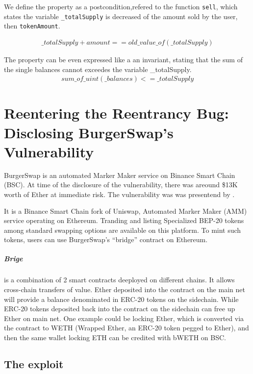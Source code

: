 We define the property as a postcondition,refered to the function \texttt{sell}, which states the variable \texttt{\_totalSupply} is decreased of the amount sold by the user, then \texttt{tokenAmount}.

\begin{equation}
    \begin{split}
        \_totalSupply + amount ==old\_value\_of(\_totalSupply) 
    \end{split}
\end{equation}

The property can be even expressed like a an invariant, stating that the sum of the single balances cannot exceedes the variable \_totalSupply.
\begin{equation}
    \begin{split}
        sum\_of\_uint(\_balances) <= \_totalSupply
    \end{split}
\end{equation}

\section{Reentering the Reentrancy Bug: Disclosing BurgerSwap's Vulnerability}   
\label{sec:Exploits:BurgerSwap}
BurgerSwap is an automated Marker Maker service on Binance Smart Chain (BSC). 
At time of the disclosure of the vulnerability, there was areound \$13K worth of Ether at immediate risk.
The vulnerability was was presentend by \citet{BurgerSwap}.

It is a Binance Smart Chain fork of Uniswap, Automated Marker Maker (AMM) service operating on Ethereum. 
Tranding and listing Specialized BEP-20 tokens among standard swapping options are available on this platform. 
To mint such tokens, users can use 
BurgerSwap's “bridge” contract on Ethereum. 

\subparagraph{Brige} is a combination of 2 smart contracts deeployed on different chains. 
It allows cross-chain transfers of value. Ether deposited into the contract on 
the main net will provide a balance denominated in ERC-20 tokens on the sidechain. 
While ERC-20 tokens deposited back into the contract on the sidechain can free up Ether on main net.
One example could be locking Ether, which is converted via the contract to WETH 
(Wrapped Ether, an ERC-20 token pegged to Ether), and then the same wallet locking ETH can be credited with bWETH on BSC.

\subsection{The exploit}
\label{sec:BurgerSwap:Vulnerability}

